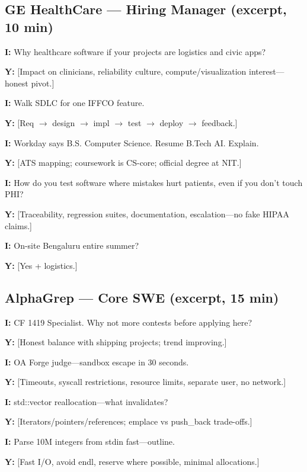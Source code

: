 \documentclass[9pt,a4paper]{article}
\begin{document}
\newpage
\subsection{GE HealthCare --- Hiring Manager (excerpt, 10 min)}

\textbf{I:} Why healthcare software if your projects are logistics and civic apps?

\textbf{Y:} [Impact on clinicians, reliability culture, compute/visualization interest---honest pivot.]

\textbf{I:} Walk SDLC for one IFFCO feature.

\textbf{Y:} [Req $\rightarrow$ design $\rightarrow$ impl $\rightarrow$ test $\rightarrow$ deploy $\rightarrow$ feedback.]

\textbf{I:} Workday says B.S. Computer Science. Resume B.Tech AI. Explain.

\textbf{Y:} [ATS mapping; coursework is CS-core; official degree at NIT.]

\textbf{I:} How do you test software where mistakes hurt patients, even if you don't touch PHI?

\textbf{Y:} [Traceability, regression suites, documentation, escalation---no fake HIPAA claims.]

\textbf{I:} On-site Bengaluru entire summer?

\textbf{Y:} [Yes + logistics.]

\newpage
\subsection{AlphaGrep --- Core SWE (excerpt, 15 min)}

\textbf{I:} CF 1419 Specialist. Why not more contests before applying here?

\textbf{Y:} [Honest balance with shipping projects; trend improving.]

\textbf{I:} OA Forge judge---sandbox escape in 30 seconds.

\textbf{Y:} [Timeouts, syscall restrictions, resource limits, separate user, no network.]

\textbf{I:} std::vector reallocation---what invalidates?

\textbf{Y:} [Iterators/pointers/references; emplace vs push\_back trade-offs.]

\textbf{I:} Parse 10M integers from stdin fast---outline.

\textbf{Y:} [Fast I/O, avoid endl, reserve where possible, minimal allocations.]
\end{document}
